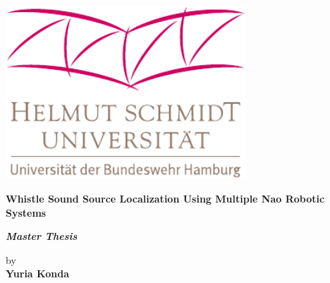 
\begin{titlepage}
    \label{sec:title}

    \large
    \begin{center}

        \href{http://www.unibw-hamburg.de}
        {%
            \includegraphics[width = 9cm]{figures/hsu/HSU-logo_farbe}
        }

        \vspace{2cm}

        \begin{minipage}{.9\linewidth}
            {\centering\Huge\bf Whistle Sound Source Localization Using Multiple Nao Robotic Systems\par}
        \end{minipage}

        \large


        \vspace{1.5cm}
        {\huge{\bf \it Master Thesis} %
        }

        \vspace{0.6cm}
        {
        \Large by \\[.5cm]
        {\bf \LARGE \huge Yuria Konda}\\[1.5cm]
        }


\end{center}
\end{titlepage}
